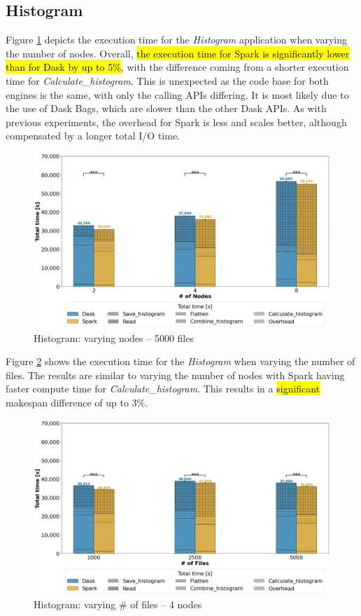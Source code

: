 \documentclass[AMA,STIX1COL]{WileyNJD-v2}
\newcommand{\HL}[1]{\hl{#1}}
\begin{document}
\subsection{Histogram}
Figure \ref{fig:histogram_worker} depicts the execution time for the \textit{Histogram} application when varying the number of nodes.
Overall, \HL{the execution time for Spark is significantly lower than for Dask by up to 5\%}, with the difference coming from a shorter execution time for \textit{Calculate\_histogram}.
This is unexpected as the code base for both engines is the same, with only the calling APIs differing.
It is most likely due to the use of Dask Bags, which are slower than the other Dask APIs.
As with previous experiments, the overhead for Spark is less and scales better, although compensated by a longer total I/O time.
\begin{figure}[!h]
	\centering
	\includegraphics[clip,width=0.75\columnwidth]{figures/stacked_histogram_worker.jpg}
	\caption{Histogram: varying nodes -- 5000 files}
	\label{fig:histogram_worker}
\end{figure}
								
Figure \ref{fig:histogram_block} shows the execution time for the \textit{Histogram} when varying the number of files.
The results are similar to varying the number of nodes with Spark having faster compute time for \textit{Calculate\_histogram}.
This results in a \HL{significant} makespan difference of up to 3\%.
\begin{figure}[!h]
	\centering
	\includegraphics[clip,width=0.75\columnwidth]{figures/stacked_histogram_block.jpg}
	\caption{Histogram: varying \# of files -- 4 nodes}
	\label{fig:histogram_block}
\end{figure}
						
\end{document}

